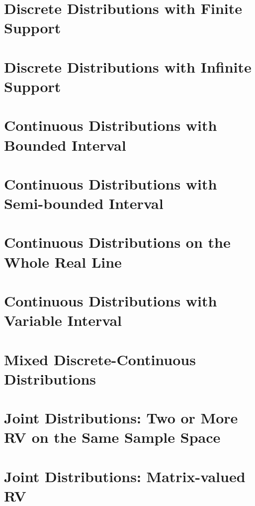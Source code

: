 \section{Discrete Distributions with Finite Support}


\section{Discrete Distributions with Infinite Support}


\section{Continuous Distributions with Bounded Interval}


\section{Continuous Distributions with Semi-bounded Interval}


\section{Continuous Distributions on the Whole Real Line}


\section{Continuous Distributions with Variable Interval}


\section{Mixed Discrete-Continuous Distributions}


\section{Joint Distributions: Two or More RV on the Same Sample Space}


\section{Joint Distributions: Matrix-valued RV}

